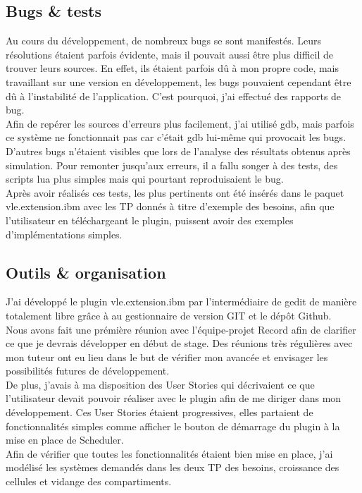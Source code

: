 \subsection{Bugs \& tests}
Au cours du développement, de nombreux bugs se sont manifestés. Leurs résolutions étaient parfois évidente, mais il pouvait aussi être plus difficil de trouver leurs sources. En effet, ils étaient parfois dû à mon propre code, mais travaillant sur une version en développement, les bugs pouvaient cependant être dû à l'instabilité de l'application. C'est pourquoi, j'ai effectué des rapports de bug.\\

Afin de repérer les sources d'erreurs plus facilement, j'ai utilisé gdb, mais parfois ce système ne fonctionnait pas car c'était gdb lui-même qui provocait les bugs.\\
D'autres bugs n'étaient visibles que lors de l'analyse des résultats obtenus après simulation. Pour remonter jusqu'aux erreurs, il a fallu songer à des tests, des scripts lua plus simples mais qui pourtant reproduisaient le bug.\\
Après avoir réalisés ces tests, les plus pertinents ont été insérés dans le paquet vle.extension.ibm avec les TP donnés à titre d'exemple des besoins, afin que l'utilisateur en téléchargeant le plugin, puissent avoir des exemples d'implémentations simples.

\subsection{Outils \& organisation}
J'ai développé le plugin vle.extension.ibm par l'intermédiaire de gedit de manière totalement libre grâce à au gestionnaire de version GIT et le dépôt Github.\\
Nous avons fait une prémière réunion avec l'équipe-projet Record afin de clarifier ce que je devrais développer en début de stage. Des réunions très régulières avec mon tuteur ont eu lieu dans le but de vérifier mon avancée et envisager les possibilités futures de développement.\\
De plus, j'avais à ma disposition des User Stories qui décrivaient ce que l'utilisateur devait pouvoir réaliser avec le plugin afin de me diriger dans mon développement. Ces User Stories étaient progressives, elles partaient de fonctionnalités simples comme afficher le bouton de démarrage du plugin à la mise en place de Scheduler.\\
Afin de vérifier que toutes les fonctionnalités étaient bien mise en place, j'ai modélisé les systèmes demandés dans les deux TP des besoins, croissance des cellules et vidange des compartiments.